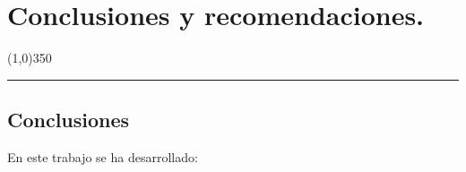 \documentclass[10pt]{report}
\numberwithin{equation}{chapter}
\numberwithin{algorithm}{chapter}
\begin{document}
\chapter{Conclusiones y recomendaciones.}
\begin{center}
\line(1,0){350}\\
\rule[-.4\baselineskip]{1.0\linewidth}{3.2pt}
\end{center}
\titleformat{\section}[hang]{\large}{ \Large \bfseries \thesection }{10pt}{\filright\Large\bfseries}
\section{Conclusiones}
En este trabajo se ha desarrollado: 
\end{document}
